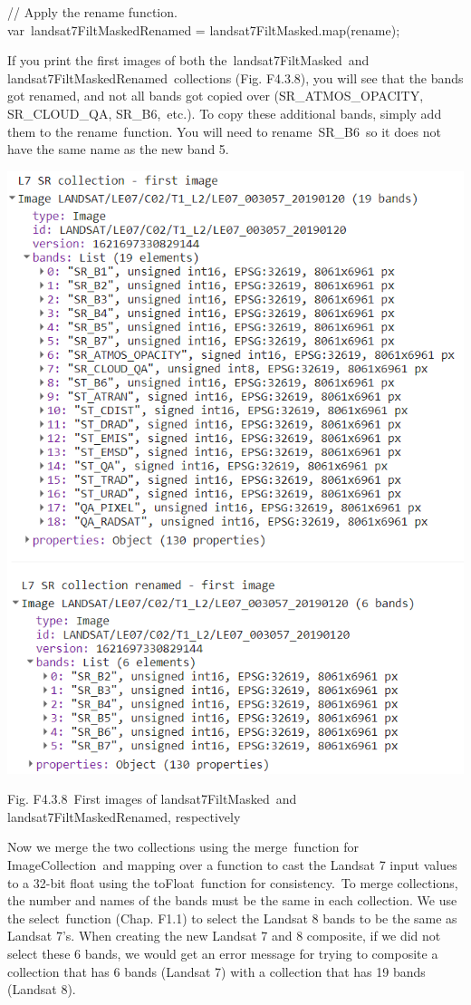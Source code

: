 \documentclass[
  letterpaper,
  DIV=11,
  numbers=noendperiod]{scrreprt}
\begin{document}
// Apply the rename function.\\
var~landsat7FiltMaskedRenamed = landsat7FiltMasked.map(rename);

If you print the first images of both the~landsat7FiltMasked~and
landsat7FiltMaskedRenamed~collections (Fig. F4.3.8), you will see that
the bands got renamed, and not all bands got copied over
(SR\_ATMOS\_OPACITY, SR\_CLOUD\_QA, SR\_B6,~etc.). To copy these
additional bands, simply add them to the rename~function. You will need
to rename~SR\_B6~so it does not have the same name as the new band 5.

\includegraphics{./F4/image15.png}

Fig. F4.3.8~First images of landsat7FiltMasked~and
landsat7FiltMaskedRenamed, respectively

Now we merge the two collections using the merge~function for
ImageCollection~and mapping over a function to cast the Landsat 7 input
values to a 32-bit float using the toFloat~function for consistency.~To
merge collections, the number and names of the bands must be the same in
each collection. We use the select~function (Chap. F1.1) to select the
Landsat 8 bands to be the same as Landsat 7's. When creating the new
Landsat 7 and 8 composite, if we did not select these 6 bands, we would
get an error message for trying to composite a collection that has 6
bands (Landsat 7) with a collection that has 19 bands (Landsat 8).
\end{document}
